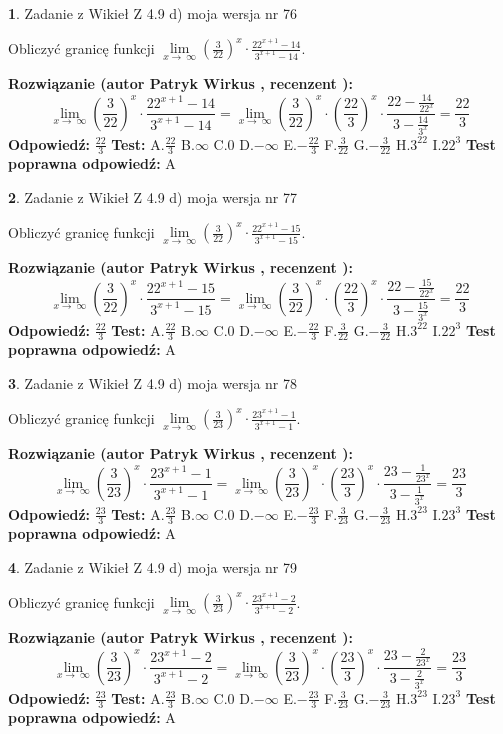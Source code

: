 \documentclass[12pt, a4paper]{article}
\theoremstyle{definition} %
\newtheorem{zad}{}
\newcommand{\zadStart}[1]{\begin{zad}#1\newline}
\newcommand{\zadStop}{\end{zad}}
\newcommand{\rozwStart}[2]{\noindent \textbf{Rozwiązanie (autor #1 , recenzent #2): }\newline}
\newcommand{\rozwStop}{\newline}
\newcommand{\odpStart}{\noindent \textbf{Odpowiedź:}\newline}
\newcommand{\odpStop}{\newline}
\newcommand{\testStart}{\noindent \textbf{Test:}\newline}
\newcommand{\testStop}{\newline}
\newcommand{\kluczStart}{\noindent \textbf{Test poprawna odpowiedź:}\newline}
\newcommand{\kluczStop}{\newline}
\begin{document}
\zadStart{Zadanie z Wikieł Z 4.9 d) moja wersja nr 76}


Obliczyć granicę funkcji  $\lim\limits_{x\to\ \infty}(\frac{3}{22})^{x}\cdot\frac{22^{x+1}-14}{3^{x+1}-14}$.
\zadStop
\rozwStart{Patryk Wirkus}{}
$$\lim\limits_{x\to\ \infty}(\frac{3}{22})^{x}\cdot\frac{22^{x+1}-14}{3^{x+1}-14}=\lim\limits_{x\to\ \infty}(\frac{3}{22})^{x}\cdot(\frac{22}{3})^{x} \cdot \frac{22-\frac{14}{22^{x}}}{3-\frac{14}{3^{x}}} = \frac{22}{3}$$
\rozwStop
\odpStart
$\frac{22}{3}$
\odpStop
\testStart
A.$\frac{22}{3}$ B.$\infty$ C.$0$ D.$-\infty$ E.$-\frac{22}{3}$
F.$\frac{3}{22}$ G.$-\frac{3}{22}$
H.$3^{22}$
I.$22^{3}$
\testStop
\kluczStart
A
\kluczStop



\zadStart{Zadanie z Wikieł Z 4.9 d) moja wersja nr 77}


Obliczyć granicę funkcji  $\lim\limits_{x\to\ \infty}(\frac{3}{22})^{x}\cdot\frac{22^{x+1}-15}{3^{x+1}-15}$.
\zadStop
\rozwStart{Patryk Wirkus}{}
$$\lim\limits_{x\to\ \infty}(\frac{3}{22})^{x}\cdot\frac{22^{x+1}-15}{3^{x+1}-15}=\lim\limits_{x\to\ \infty}(\frac{3}{22})^{x}\cdot(\frac{22}{3})^{x} \cdot \frac{22-\frac{15}{22^{x}}}{3-\frac{15}{3^{x}}} = \frac{22}{3}$$
\rozwStop
\odpStart
$\frac{22}{3}$
\odpStop
\testStart
A.$\frac{22}{3}$ B.$\infty$ C.$0$ D.$-\infty$ E.$-\frac{22}{3}$
F.$\frac{3}{22}$ G.$-\frac{3}{22}$
H.$3^{22}$
I.$22^{3}$
\testStop
\kluczStart
A
\kluczStop



\zadStart{Zadanie z Wikieł Z 4.9 d) moja wersja nr 78}


Obliczyć granicę funkcji  $\lim\limits_{x\to\ \infty}(\frac{3}{23})^{x}\cdot\frac{23^{x+1}-1}{3^{x+1}-1}$.
\zadStop
\rozwStart{Patryk Wirkus}{}
$$\lim\limits_{x\to\ \infty}(\frac{3}{23})^{x}\cdot\frac{23^{x+1}-1}{3^{x+1}-1}=\lim\limits_{x\to\ \infty}(\frac{3}{23})^{x}\cdot(\frac{23}{3})^{x} \cdot \frac{23-\frac{1}{23^{x}}}{3-\frac{1}{3^{x}}} = \frac{23}{3}$$
\rozwStop
\odpStart
$\frac{23}{3}$
\odpStop
\testStart
A.$\frac{23}{3}$ B.$\infty$ C.$0$ D.$-\infty$ E.$-\frac{23}{3}$
F.$\frac{3}{23}$ G.$-\frac{3}{23}$
H.$3^{23}$
I.$23^{3}$
\testStop
\kluczStart
A
\kluczStop



\zadStart{Zadanie z Wikieł Z 4.9 d) moja wersja nr 79}


Obliczyć granicę funkcji  $\lim\limits_{x\to\ \infty}(\frac{3}{23})^{x}\cdot\frac{23^{x+1}-2}{3^{x+1}-2}$.
\zadStop
\rozwStart{Patryk Wirkus}{}
$$\lim\limits_{x\to\ \infty}(\frac{3}{23})^{x}\cdot\frac{23^{x+1}-2}{3^{x+1}-2}=\lim\limits_{x\to\ \infty}(\frac{3}{23})^{x}\cdot(\frac{23}{3})^{x} \cdot \frac{23-\frac{2}{23^{x}}}{3-\frac{2}{3^{x}}} = \frac{23}{3}$$
\rozwStop
\odpStart
$\frac{23}{3}$
\odpStop
\testStart
A.$\frac{23}{3}$ B.$\infty$ C.$0$ D.$-\infty$ E.$-\frac{23}{3}$
F.$\frac{3}{23}$ G.$-\frac{3}{23}$
H.$3^{23}$
I.$23^{3}$
\testStop
\kluczStart
A
\kluczStop
\end{document}
